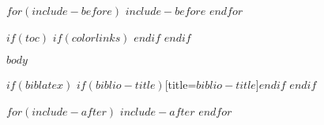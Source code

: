 \documentclass[ngerman,a4paper]{scrartcl}
\begin{document}
$for(include-before)$
$include-before$
$endfor$

$if(toc)$
{
$if(colorlinks)$
\hypersetup{linkcolor=$if(toccolor)$$toccolor$$else$black$endif$}
$endif$
\setcounter{tocdepth}{$toc-depth$}
\tableofcontents
}
$endif$

$body$

$if(biblatex)$
\printbibliography$if(biblio-title)$[title=$biblio-title$]$endif$
$endif$

$for(include-after)$
$include-after$
$endfor$
\end{document}
